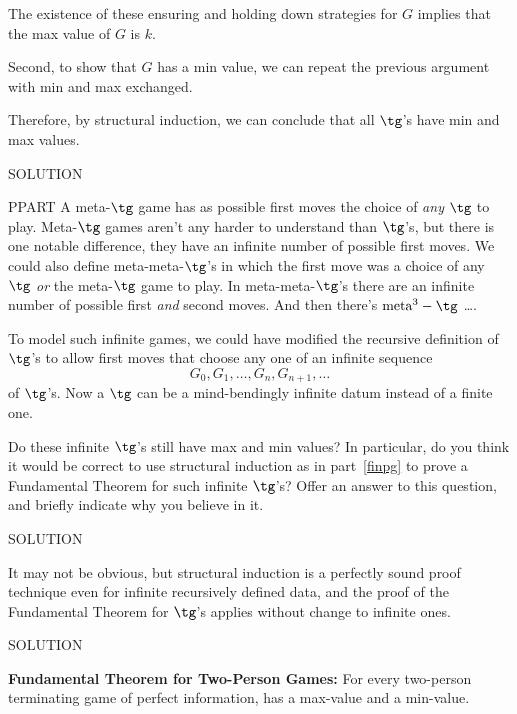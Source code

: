 The existence of these ensuring and holding down strategies for $G$
implies that the max value of $G$ is $k$.

Second, to show that $G$ has a min value, we can repeat the previous
argument with min and max exchanged.

Therefore, by structural induction, we can conclude that all $\tg$'s have
min and max values.

SOLUTION

PPART A meta-$\tg$ game has as possible first moves the choice of
\emph{any} $\tg$ to play.  Meta-$\tg$ games aren't any harder to
understand than $\tg$'s, but there is one notable difference, they
have an infinite number of possible first moves.  We could also define
meta-meta-$\tg$'s in which the first move was a choice of any
$\tg$ \emph{or} the meta-$\tg$ game to play.  In
meta-meta-$\tg$'s there are an infinite number of possible first
\emph{and} second moves.  And then there's $\text{meta}^3-\tg$ \dots.

\iffalse
The 2D-origin game in a Week 4 class problem is a game in which there are
an infinite number of possible first moves, an infinite number of possible
second moves, \dots.  \iffalse (with two values, ``win'' or ``lose''
instead of values from -50 to 50)\fi
\fi

To model such infinite games, we could have modified the recursive
definition of $\tg$'s to allow first moves that choose any one of an
infinite sequence
\[
G_0,G_1,\dots,G_n,G_{n+1}, \dots
\]
of $\tg$'s.  Now a $\tg$ can be a mind-bendingly infinite datum
instead of a finite one.

Do these infinite $\tg$'s still have max and min values?  In
particular, do you think it would be correct to use structural induction
as in part~\eqref{finpg} to prove a Fundamental Theorem for such infinite
$\tg$'s?  Offer an answer to this question, and briefly indicate why
you believe in it.

SOLUTION

It may not be obvious, but structural induction is a perfectly sound proof
technique even for infinite recursively defined data, and the proof of the
Fundamental Theorem for $\tg$'s applies without change to infinite ones.

SOLUTION

\begin{theorem}\label{fund}
  \textbf{Fundamental Theorem for Two-Person Games:} For every two-person
  terminating game of perfect information, has a max-value and a
  min-value.
\end{theorem}

